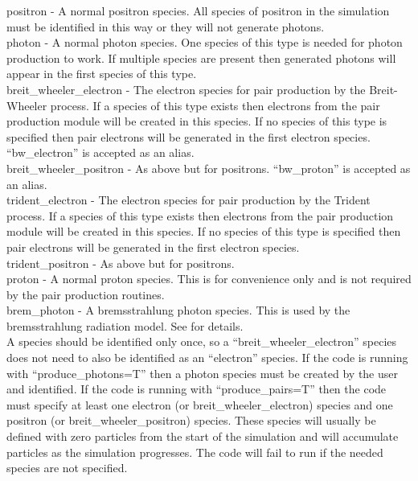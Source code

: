 {\emphtext positron} - A normal positron species. All species of positron in
  the simulation must be identified in this way or they will not generate
  photons.\\

{\emphtext photon} - A normal photon species. One species of this type is
  needed for photon production to work. If multiple species are present then
  generated photons will appear in the first species of this type.\\

{\emphtext breit\_wheeler\_electron} - The electron species for pair production
  by the Breit-Wheeler process. If a species of this type exists then electrons
  from the pair production module will be created in this species. If no species
  of this type is specified then pair electrons will be generated in the first
  electron species. ``bw\_electron'' is accepted as an alias.\\

{\emphtext breit\_wheeler\_positron} - As above but for positrons.
  ``bw\_proton'' is accepted as an alias.\\

{\emphtext trident\_electron} - The electron species for pair production by
  the Trident process. If a species of this type exists then electrons from
  the pair production module will be created in this species. If no species
  of this type is specified then pair electrons will be generated in the first
  electron species.\\

{\emphtext trident\_positron} - As above but for positrons.\\

{\emphtext proton} - A normal proton species. This is for convenience only and
  is not required by the pair production routines.\\

{\emphtext brem\_photon} - A bremsstrahlung photon species. This is used by the
  bremsstrahlung radiation model. See  for details.\\

A species should be identified only once, so a ``breit\_wheeler\_electron''
species does not need to also be identified as an ``electron'' species. If the
code is running with ``produce\_photons=T'' then a photon species must be
created by the user and identified. If the code is running with
``produce\_pairs=T'' then the code must specify at least one electron (or
breit\_wheeler\_electron) species and one positron (or breit\_wheeler\_positron)
species. These species will usually be defined with zero particles from the
start of the simulation and will accumulate particles as the simulation
progresses. The code will fail to run if the needed species are not specified.

